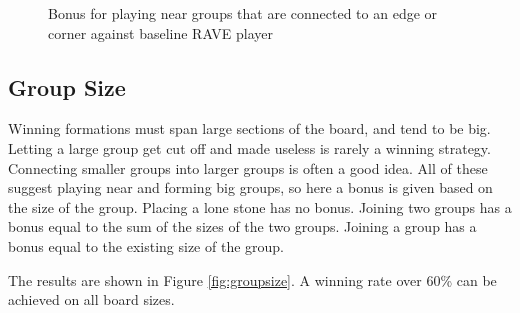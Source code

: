 \begin{figure}
	\centering
{}
	\caption{Bonus for playing near groups that are connected to an edge or corner against baseline RAVE player}
	\label{fig:connectivity}
\end{figure}


\subsection{Group Size}

Winning formations must span large sections of the board, and tend to be big. Letting a large group get cut off and made useless is rarely a winning strategy. Connecting smaller groups into larger groups is often a good idea. All of these suggest playing near and forming big groups, so here a bonus is given based on the size of the group. Placing a lone stone has no bonus. Joining two groups has a bonus equal to the sum of the sizes of the two groups. Joining a group has a bonus equal to the existing size of the group.

The results are shown in Figure \ref{fig:groupsize}. A winning rate over 60\% can be achieved on all board sizes.

